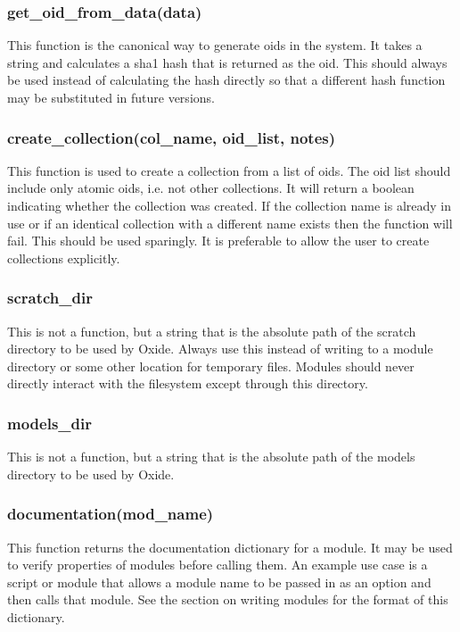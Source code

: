 \documentclass{book}
\begin{document}
\subsubsection{get\_oid\_from\_data(data)}

This function is the canonical way to generate oids in the system.  It takes a string and calculates a sha1 hash that is returned as the oid.  This should always be used instead of calculating the hash directly so that a different hash function may be substituted in future versions.
     
\subsubsection{create\_collection(col\_name, oid\_list, notes)}

This function is used to create a collection from a list of oids.  The oid list should include only atomic oids, i.e. not other collections.  It will return a boolean indicating whether the collection was created.  If the collection name is already in use or if an identical collection with a different name exists then the function will fail.  This should be used sparingly.  It is preferable to allow the user to create collections explicitly.

\subsubsection{scratch\_dir}           

This is not a function, but a string that is the absolute path of the scratch directory to be used by Oxide.  Always use this instead of writing to a module directory or some other location for temporary files.  Modules should never directly interact with the filesystem except through this directory.

\subsubsection{models\_dir}           
This is not a function, but a string that is the absolute path of the models directory to be used by Oxide. 

\subsubsection{documentation(mod\_name)}

This function returns the documentation dictionary for a module.  It may be used to verify properties of modules before calling them.  An example use case is a script or module that allows a module name to be passed in as an option and then calls that module.  See the section on writing modules for the format of this dictionary.
\end{document}
